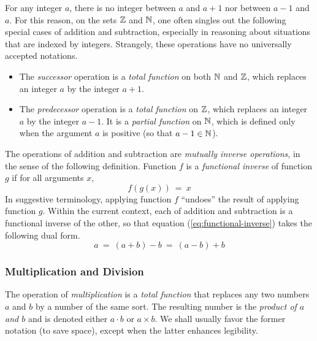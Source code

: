  
For any integer $a$, there is no integer between $a$ and $a+1$ nor between $a-1$ and $a$. For this reason, on the sets $\mathbb{Z}$ and $\mathbb{N}$, one often singles out the following special cases of addition and subtraction, especially in reasoning about situations that are indexed by integers.  Strangely, these operations have no universally accepted notations.
\begin{itemize}
\item
The {\it successor} operation is a {\em total function} on both $\mathbb{N}$ and $\mathbb{Z}$, which replaces an
integer $a$ by the integer $a+1$.
\item
The {\it predecessor} operation is a {\em total function} on $\mathbb{Z}$, which replaces an integer $a$ by the integer $a-1$.  It is a {\em partial function} on $\mathbb{N}$, which is defined only when the argument $a$ is positive (so that $a-1 \in \mathbb{N}$).
\end{itemize}

\smallskip

The operations of addition and subtraction are {\em mutually inverse operations}, in the sense of the following definition.  Function $f$ is a {\it functional inverse} of function $g$ if for all arguments $x$,
\begin{equation}
\label{eq:functional-inverse}
f(g(x)) \ = \ x
\end{equation}
In suggestive terminology, applying function $f$ ``undoes'' the result of applying function $g$.  Within the current context, each of addition and subtraction is a functional inverse of the other, so that equation (\ref{eq:functional-inverse}) takes the following dual form.
\[ a \ = \ (a+b) -b \ = \ (a-b) +b \]

\subsubsection{Multiplication and Division}
 
 
 

The operation of {\it multiplication} is a {\em total function} that replaces any two numbers $a$ and $b$ by a number of the same sort.  The resulting number is the {\em product of $a$ and $b$} and is denoted either $a \cdot b$  or $a \times b$.  We shall usually favor the former notation (to save space), except when the latter enhances legibility.

